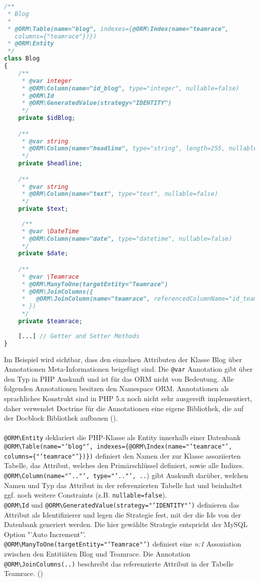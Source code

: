 \documentclass[12pt]{report}
\begin{document}
\begin{lstlisting}[language=PHP, caption=Auszug aus src/TeamRace/WebBundle/Entity/Blog.php]
/**
 * Blog
 *
 * @ORM\Table(name="blog", indexes={@ORM\Index(name="teamrace", 
   columns={"teamrace"})})
 * @ORM\Entity
 */
class Blog
{
    /**
     * @var integer
     * @ORM\Column(name="id_blog", type="integer", nullable=false)
     * @ORM\Id
     * @ORM\GeneratedValue(strategy="IDENTITY")
     */
    private $idBlog;

    /**
     * @var string
     * @ORM\Column(name="headline", type="string", length=255, nullable=false)
     */
    private $headline;

    /**
     * @var string
     * @ORM\Column(name="text", type="text", nullable=false)
     */
    private $text;
    
     /**
     * @var \DateTime
     * @ORM\Column(name="date", type="datetime", nullable=false)
     */
    private $date;

    /**
     * @var \Teamrace
     * @ORM\ManyToOne(targetEntity="Teamrace")
     * @ORM\JoinColumns({
     *   @ORM\JoinColumn(name="teamrace", referencedColumnName="id_teamrace")
     * })
     */
    private $teamrace;
    
    [...] // Getter and Setter Methods
}
\end{lstlisting}
Im Beispiel wird sichtbar, dass den einzelnen Attributen der Klasse Blog über Annotationen Meta-Informationen beigefügt sind. Die \texttt{@var} Annotation gibt über den Typ in PHP Auskunft und ist für das ORM nicht von Bedeutung. Alle folgenden Annotationen besitzen den Namespace ORM. Annotationen als sprachliches Konstrukt sind in PHP 5.x noch nicht sehr ausgereift implementiert, daher verwendet Doctrine für die Annotationen eine eigene Bibliothek, die auf der Docblock Bibliothek aufbauen (\cite{Doctrine:BasicMapping}).\\\\ 
\texttt{@ORM\textbackslash Entity} deklariert die PHP-Klasse als Entity innerhalb einer Datenbank\\
\texttt{@ORM\textbackslash Table(name="'blog"', indexes=\{@ORM\textbackslash Index(name="'teamrace"', columns=\{"'teamrace"'\})\})} 
definiert den Namen der zur Klasse assoziierten Tabelle, das Attribut, welches den Primärschlüssel definiert, sowie alle Indizes.\\
\texttt{@ORM\textbackslash Column(name="'.."', type="'.."', ..}) gibt Auskunft darüber, welchen Namen und Typ das Attribut in der referenzierten Tabelle hat und beinhaltet ggf. noch weitere Constraints (z.B. \texttt{nullable=false}).\\
\texttt{@ORM\textbackslash Id} und \texttt{@ORM\textbackslash GeneratedValue(strategy="'IDENTITY"')} definieren das Attribut als Identifizierer und legen die Strategie fest, mit der die Ids von der Datenbank generiert werden. Die hier gewählte Strategie entspricht der MySQL Option "'Auto Increment"'.\\
\texttt{@ORM\textbackslash ManyToOne(targetEntity="'Teamrace"')} definiert eine \emph{n:1} Assoziation zwischen den Entitiäten Blog und Teamrace. Die Annotation \texttt{@ORM\textbackslash JoinColumns(..)} beschreibt das referenzierte Attribut in der Tabelle Teamrace. (\cite{Doctrine:Associations})
\end{document}
